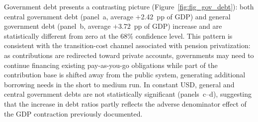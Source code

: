 \documentclass[11pt,english,a4paper, twoside, authoryear]{article}
\begin{document}
\clearpage 

Government debt presents a contrasting picture (Figure~\ref{fig:fig_gov_debt}): both central government debt (panel~a, average $+$2.42~pp of GDP) and general government debt (panel~b, average $+$3.72~pp of GDP) increase and are statistically different from zero at the 68\% confidence level. This pattern is consistent with the transition-cost channel associated with pension privatization: as contributions are redirected toward private accounts, governments may need to continue financing existing pay-as-you-go obligations while part of the contribution base is shifted away from the public system, generating additional borrowing needs in the short to medium run. In constant USD, general and central government debts are not statistically significant (panels~c--d), suggesting that the increase in debt ratios partly reflects the adverse denominator effect of the GDP contraction previously documented.\\ %
\end{document}
